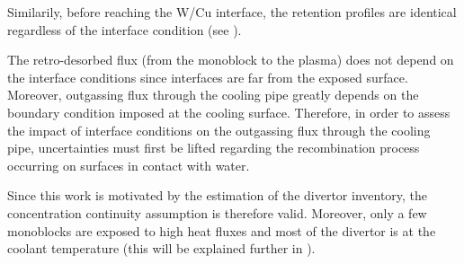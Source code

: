 Similarily, before reaching the W/Cu interface, the retention profiles are identical regardless of the interface condition (see ).

The retro-desorbed flux (from the monoblock to the plasma) does not depend on the interface conditions since interfaces are far from the exposed surface.
Moreover, outgassing flux through the cooling pipe greatly depends on the boundary condition imposed at the cooling surface.
Therefore, in order to assess the impact of interface conditions on the outgassing flux through the cooling pipe, uncertainties must first be lifted regarding the recombination process occurring on surfaces in contact with water.

Since this work is motivated by the estimation of the divertor inventory, the concentration continuity assumption is therefore valid.
Moreover, only a few monoblocks are exposed to high heat fluxes and most of the divertor is at the coolant temperature (this will be explained further in ).
